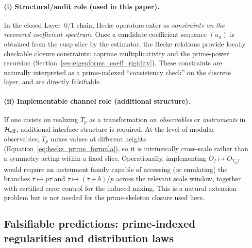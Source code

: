 \paragraph{(i) Structural/audit role (used in this paper).}
In the closed Layer~0/1 chain, Hecke operators enter as \emph{constraints on the recovered coefficient spectrum}.
Once a candidate coefficient sequence $(a_n)$ is obtained from the cusp slice by the estimator, the Hecke relations provide locally checkable closure constraints:
coprime multiplicativity and the prime-power recursion (Section~\ref{sec:eigenforms_coeff_rigidity}).
These constraints are naturally interpreted as a prime-indexed ``consistency check'' on the discrete layer, and are directly falsifiable.
\par
\paragraph{(ii) Implementable channel role (additional structure).}
If one insists on realizing $T_p$ as a transformation on \emph{observables} or \emph{instruments} in $\mathcal{H}_{\mathrm{eff}}$, additional interface structure is required.
At the level of modular observables, $T_p$ mixes values at different heights (Equation~\eqref{eq:hecke_prime_formula}), so it is intrinsically cross-scale rather than a symmetry acting within a fixed slice.
Operationally, implementing $O_f\mapsto O_{T_p f}$ would require an instrument family capable of accessing (or emulating) the branches $\tau\mapsto p\tau$ and $\tau\mapsto(\tau+b)/p$ across the relevant scale window, together with certified error control for the induced mixing.
This is a natural extension problem but is not needed for the prime-skeleton closure used here.

\subsection{Falsifiable predictions: prime-indexed regularities and distribution laws}
\label{app:falsifiability_prime_regularities}

